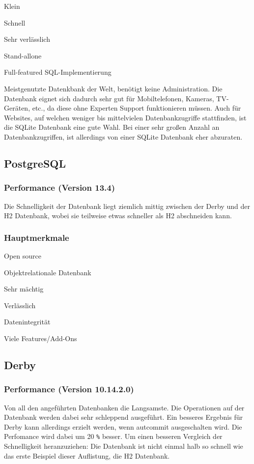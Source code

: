 \begin{compactitem}
    \item Klein
    \item Schnell         
    \item Sehr verlässlich
    \item Stand-allone
    \item Full-featured SQL-Implementierung
\end{compactitem}

Meistgenutzte Datenkbank der Welt, benötigt keine Administration. Die Datenbank eignet sich dadurch sehr gut für Mobiltelefonen, Kameras, TV-Geräten, etc., da diese ohne Experten Support funktionieren müssen. Auch für Websites, auf welchen weniger bis mittelvielen Datenbankzugriffe stattfinden, ist die SQLite Datenbank eine gute Wahl. Bei einer sehr großen Anzahl an Datenbankzugriffen, ist allerdings von einer SQLite Datenbank eher abzuraten. 

\subsection{PostgreSQL}
\subsubsection{Performance (Version 13.4)}
Die Schnelligkeit der Datenbank liegt ziemlich mittig zwischen der Derby und der H2 Datenbank, wobei sie teilweise etwas schneller als H2 abschneiden kann. 

\subsubsection{Hauptmerkmale}

\begin{compactitem}
    \item Open source
    \item Objektrelationale Datenbank         
    \item Sehr mächtig
    \item Verlässlich
    \item Datenintegrität
    \item Viele Features/Add-Ons
\end{compactitem}

\subsection{Derby}
\subsubsection{Performance (Version 10.14.2.0)}
Von all den angeführten Datenbanken die Langsamste. Die Operationen auf der Datenbank werden dabei sehr schleppend ausgeführt. Ein besseres Ergebnis für Derby kann allerdings erzielt werden, wenn autcommit ausgeschalten wird. Die Perfomance wird dabei um 20 \texttt{\%} besser. Um einen besseren Vergleich der Schnelligkeit heranzuziehen: Die Datenbank ist nicht einmal halb so schnell wie das erste Beispiel dieser Auflistung, die H2 Datenbank. 


